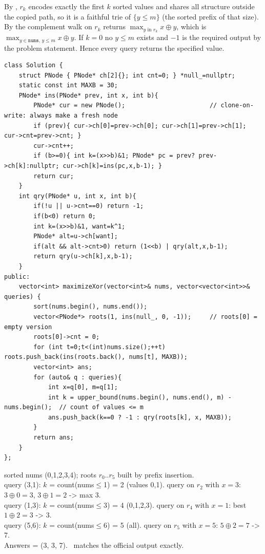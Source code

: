 \begin{proofbox}
By , $r_k$ encodes exactly the first $k$ sorted values and shares all structure
outside the copied path, so it is a faithful trie of $\{y\le m\}$ (the sorted prefix of that size). By
 the complement walk on $r_k$ returns $\max_{y \text{ in } r_k} x\oplus y$, which is
$\max_{y\in\texttt{nums},\,y\le m} x\oplus y$. If $k=0$ no $y\le m$ exists and $-1$ is the required output
by the problem statement. Hence every query returns the specified value. \end{proofbox}

\begin{lstlisting}[caption={LeetCode 1707 -- sort, build persistent roots, upper\_bound + version query}, label={lst:c08-persistxor-soln}]
class Solution {
    struct PNode { PNode* ch[2]{}; int cnt=0; } *null_=nullptr;
    static const int MAXB = 30;
    PNode* ins(PNode* prev, int x, int b){
        PNode* cur = new PNode();                       // clone-on-write: always make a fresh node
        if (prev){ cur->ch[0]=prev->ch[0]; cur->ch[1]=prev->ch[1]; cur->cnt=prev->cnt; }
        cur->cnt++;
        if (b>=0){ int k=(x>>b)&1; PNode* pc = prev? prev->ch[k]:nullptr; cur->ch[k]=ins(pc,x,b-1); }
        return cur;
    }
    int qry(PNode* u, int x, int b){
        if(!u || u->cnt==0) return -1;
        if(b<0) return 0;
        int k=(x>>b)&1, want=k^1;
        PNode* alt=u->ch[want];
        if(alt && alt->cnt>0) return (1<<b) | qry(alt,x,b-1);
        return qry(u->ch[k],x,b-1);
    }
public:
    vector<int> maximizeXor(vector<int>& nums, vector<vector<int>>& queries) {
        sort(nums.begin(), nums.end());
        vector<PNode*> roots(1, ins(null_, 0, -1));     // roots[0] = empty version
        roots[0]->cnt = 0;
        for (int t=0;t<(int)nums.size();++t) roots.push_back(ins(roots.back(), nums[t], MAXB));
        vector<int> ans;
        for (auto& q : queries){
            int x=q[0], m=q[1];
            int k = upper_bound(nums.begin(), nums.end(), m) - nums.begin();  // count of values <= m
            ans.push_back(k==0 ? -1 : qry(roots[k], x, MAXB));
        }
        return ans;
    }
};
\end{lstlisting}

\begin{tracebox}[Official sample: nums=(0,1,2,3,4), queries (3,1),(1,3),(5,6) -> 3,3,7]
sorted nums (0,1,2,3,4); roots $r_0..r_5$ built by prefix insertion.\\
query (3,1): $k$ = count(nums$\le$1) = 2 (values 0,1). query on $r_2$ with $x{=}3$: $3\oplus 0{=}3$, $3\oplus 1{=}2$ -> max 3.\\
query (1,3): $k$ = count(nums$\le$3) = 4 (0,1,2,3). query on $r_4$ with $x{=}1$: best $1\oplus 2{=}3$ -> 3.\\
query (5,6): $k$ = count(nums$\le$6) = 5 (all). query on $r_5$ with $x{=}5$: $5\oplus 2{=}7$ -> 7.\\
Answers = (3, 3, 7). \checkmark\ matches the official output exactly.
\end{tracebox}

